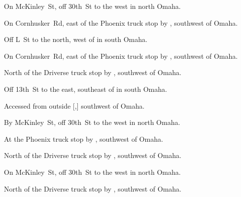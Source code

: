 
\begin{LocationList}

On  McKinley~St, off  30th~St to the west in north Omaha.

On Cornhusker~Rd, east of the Phoenix truck stop by  , southwest of Omaha.

Off  L~St to the north, west of  in south Omaha.

On Cornhusker~Rd, east of the Phoenix truck stop by  , southwest of Omaha.

\Location{\GarageHQ \Garage}
North of the Driverse truck stop by  , southwest of Omaha.

Off 13th~St to the east, southeast of  in south Omaha.

Accessed from  outside [,] southwest of Omaha.

By  McKinley~St, off  30th~St to the west in north Omaha.

At the Phoenix truck stop by  , southwest of Omaha.

North of the Driverse truck stop by  , southwest of Omaha.

On  McKinley~St, off  30th~St to the west in north Omaha.

North of the Driverse truck stop by  , southwest of Omaha.

\end{LocationList}
